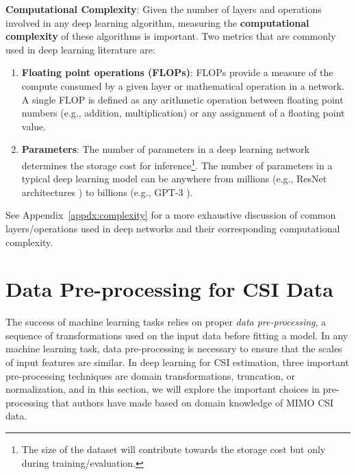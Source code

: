 \textbf{Computational Complexity}: Given the number of layers and operations involved in any deep learning algorithm, measuring the \textbf{computational complexity} of these algorithms is important. Two metrics that are commonly used in deep learning literature are:

\begin{enumerate}
	\item \textbf{Floating point operations (FLOPs)}: FLOPs provide a measure of the compute consumed by a given layer or mathematical operation in a network. A single FLOP is defined as any arithmetic operation between floating point numbers (e.g., addition, multiplication) or any assignment of a floating point value.
	\item \textbf{Parameters}: The number of parameters in a deep learning network determines the storage cost for inference\footnote{The size of the dataset will contribute towards the storage cost but only during training/evaluation.}. The number of parameters in a typical deep learning model can be anywhere from millions (e.g., ResNet architectures \cite{ref:he2016identity}) to billions (e.g., GPT-3 \cite{ref:brown2020language}).
\end{enumerate}

See Appendix~\ref{appdx:complexity} for a more exhaustive discussion of common layers/operations used in deep networks and their corresponding computational complexity.


\section{Data Pre-processing for CSI Data} \label{sec:data-preprocessing}

The success of machine learning tasks relies on proper \emph{data pre-processing}, a sequence of transformations used on the input data before fitting a model. In any machine learning task, data pre-processing is necessary to ensure that the scales of input features are similar. In deep learning for CSI estimation, three important pre-processing techniques are domain transformations, truncation, or normalization, and in this section, we will explore the important choices in pre-processing that authors have made based on domain knowledge of MIMO CSI data.

